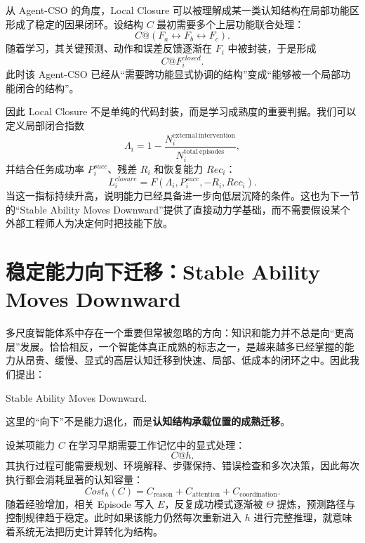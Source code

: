 从 Agent-CSO 的角度，Local Closure 可以被理解成某一类认知结构在局部功能区形成了稳定的因果闭环。设结构 $C$ 最初需要多个上层功能联合处理：
\begin{equation}
C@
(F_a\leftrightarrow F_b\leftrightarrow F_c).
\end{equation}
随着学习，其关键预测、动作和误差反馈逐渐在 $F_i$ 中被封装，于是形成
\begin{equation}
C@F_i^{closed}.
\end{equation}
此时该 Agent-CSO 已经从``需要跨功能显式协调的结构''变成``能够被一个局部功能闭合的结构''。

因此 Local Closure 不是单纯的代码封装，而是学习成熟度的重要判据。我们可以定义局部闭合指数
\begin{equation}
\Lambda_i
=
1-
\frac{
N_i^{\mathrm{external\ intervention}}
}{
N_i^{\mathrm{total\ episodes}}
},
\end{equation}
并结合任务成功率 $P_i^{succ}$、残差 $R_i$ 和恢复能力 $Rec_i$：
\begin{equation}
L_i^{closure}
=
F
\left(
\Lambda_i,
P_i^{succ},
-R_i,
Rec_i
\right).
\end{equation}
当这一指标持续升高，说明能力已经具备进一步向低层沉降的条件。这也为下一节的``Stable Ability Moves Downward''提供了直接动力学基础，而不需要假设某个外部工程师人为决定何时把技能下放。

\section{稳定能力向下迁移：Stable Ability Moves Downward}

多尺度智能体系中存在一个重要但常被忽略的方向：知识和能力并不总是向``更高层''发展。恰恰相反，一个智能体真正成熟的标志之一，是越来越多已经掌握的能力从昂贵、缓慢、显式的高层认知迁移到快速、局部、低成本的闭环之中。因此我们提出：
\begin{statementbox}
Stable Ability Moves Downward.
\end{statementbox}
这里的``向下''不是能力退化，而是\textbf{认知结构承载位置的成熟迁移}。

设某项能力 $C$ 在学习早期需要工作记忆中的显式处理：
\begin{equation}
C@h.
\end{equation}
其执行过程可能需要规划、环境解释、步骤保持、错误检查和多次决策，因此每次执行都会消耗显著的认知容量：
\begin{equation}
Cost_h(C)
=
C_{\mathrm{reason}}
+
C_{\mathrm{attention}}
+
C_{\mathrm{coordination}}.
\end{equation}
随着经验增加，相关 Episode 写入 $E$，反复成功模式逐渐被 $\Theta$ 提炼，预测路径与控制规律趋于稳定。此时如果该能力仍然每次重新进入 $h$ 进行完整推理，就意味着系统无法把历史计算转化为结构。

